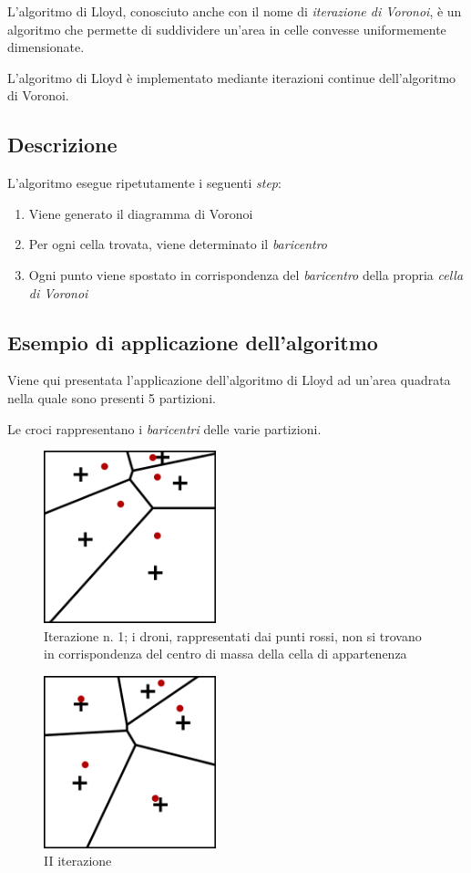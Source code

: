 \documentclass[10pt,a4paper]{article}
\begin{document}
L'algoritmo di Lloyd, conosciuto anche con il nome di \textit{iterazione di Voronoi}, è un algoritmo che permette di suddividere un'area in celle convesse uniformemente dimensionate.

L'algoritmo di Lloyd è implementato mediante iterazioni continue dell'algoritmo di Voronoi.

\subsection{Descrizione}

L'algoritmo esegue ripetutamente i seguenti \textit{step}:

\begin{enumerate}
	\item Viene generato il diagramma di Voronoi
	\item Per ogni cella trovata, viene determinato il \textit{baricentro}
	\item Ogni punto viene spostato in corrispondenza del \textit{baricentro} della propria \textit{cella di Voronoi}
\end{enumerate}

\subsection{Esempio di applicazione dell'algoritmo}

Viene qui presentata l'applicazione dell'algoritmo di Lloyd ad un'area quadrata nella quale sono presenti 5 partizioni.

Le croci rappresentano i \textit{baricentri} delle varie partizioni.

\begin{figure}[H]
\includegraphics[width=5cm]{lloyd_iterazione_1.png}
\centering
\caption{Iterazione n. 1; i droni, rappresentati dai punti rossi, non si trovano in corrispondenza del centro di massa della cella di appartenenza}
\end{figure}

\begin{figure}[H]
\includegraphics[width=5cm]{lloyd_iterazione_2.png}
\centering
\caption{II iterazione}
\end{figure}
\end{document}
